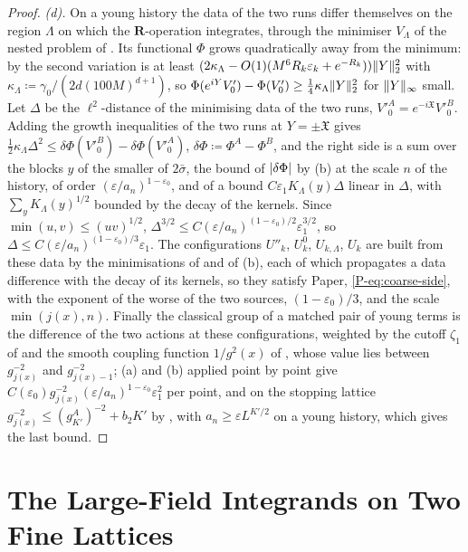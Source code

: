 \documentclass[11pt]{preprint}
\DeclarePairedDelimiter{\abs}{\lvert}{\rvert}
\DeclarePairedDelimiter{\norm}{\lVert}{\rVert}
\numberwithin{equation}{section}
\theoremstyle{definition}
\theoremstyle{remark}
\theoremstyle{plain}
\begin{document}
\begin{proof}
\emph{(d).} On a young history the data of the two runs differ themselves on the region $\Lambda$ on which the $\mathbf R$-operation integrates, through the minimiser $V_\Lambda$ of the nested problem of \cite[Proposition~1, p.~194]{BalabanLFR1}. Its functional $\Phi$ grows quadratically away from the minimum: by \cite[(1.7)--(1.9), p.~358]{BalabanLFR2} the second variation is at least $(2\kappa_\Lambda - O(1)(M^6R_k\varepsilon_k + e^{-R_k}))\norm Y_2^2$ with $\kappa_\Lambda \coloneqq \gamma_0/(2d(100M)^{d+1})$, so $\Phi(e^{iY}V'_0) - \Phi(V'_0) \geq \frac14\kappa_\Lambda\norm Y_2^2$ for $\norm Y_\infty$ small. Let $\Delta$ be the $\ell^2$-distance of the minimising data of the two runs, $V'^A_0 = e^{-i\mathfrak X}V'^B_0$. Adding the growth inequalities of the two runs at $Y = \pm\mathfrak X$ gives $\frac12\kappa_\Lambda\Delta^2 \leq \delta\Phi(V'^B_0) - \delta\Phi(V'^A_0)$, $\delta\Phi \coloneqq \Phi^A - \Phi^B$, and the right side is a sum over the blocks $y$ of the smaller of $2\bar\sigma$, the bound of $\abs{\delta\Phi}$ by (b) at the scale $n$ of the history, of order $(\varepsilon/a_n)^{1-\varepsilon_0}$, and of a bound $C\varepsilon_1K_\Lambda(y)\Delta$ linear in $\Delta$, with $\sum_yK_\Lambda(y)^{1/2}$ bounded by the decay of the kernels. Since $\min(u, v) \leq (uv)^{1/2}$, $\Delta^{3/2} \leq C(\varepsilon/a_n)^{(1-\varepsilon_0)/2}\varepsilon_1^{3/2}$, so $\Delta \leq C(\varepsilon/a_n)^{(1-\varepsilon_0)/3}\varepsilon_1$. The configurations $U''_k$, $U^0_k$, $U_{k,\Lambda}$, $U_k$ are built from these data by the minimisations of \cite[(1.51), p.~370]{BalabanLFR2} and of (b), each of which propagates a data difference with the decay of its kernels, so they satisfy Paper, \eqref{P-eq:coarse-side}, with the exponent of the worse of the two sources, $(1 - \varepsilon_0)/3$, and the scale $\min(j(x), n)$. Finally the classical group of a matched pair of young terms is the difference of the two actions at these configurations, weighted by the cutoff $\zeta_1$ of \cite{BalabanLFR2} and the smooth coupling function $1/g^2(x)$ of \cite[(2.24), p.~259]{BalabanCRE}, whose value lies between $g_{j(x)}^{-2}$ and $g_{j(x)-1}^{-2}$; (a) and (b) applied point by point give $C(\varepsilon_0)g_{j(x)}^{-2}(\varepsilon/a_n)^{1-\varepsilon_0}\varepsilon_1^2$ per point, and on the stopping lattice $g_{j(x)}^{-2} \leq (g^A_{K'})^{-2} + b_2K'$ by \cite[(2.6)]{BalabanCRE}, with $a_n \geq \varepsilon L^{K'/2}$ on a young history, which gives the last bound.
\end{proof}

\section{The Large-Field Integrands on Two Fine Lattices}\label{sec:large-field-integrands}
\end{document}
